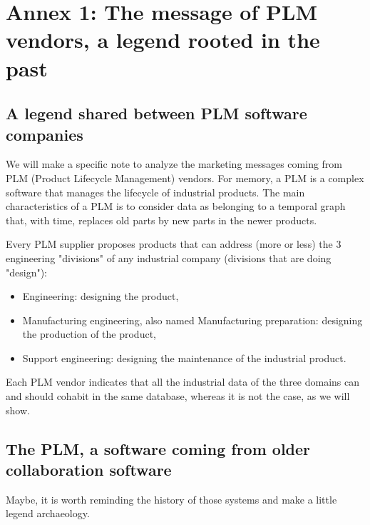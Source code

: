 \documentclass[]{article}
\begin{document}
\section{Annex 1: The message of PLM vendors, a legend rooted in the past}

\subsection{A legend shared between PLM software companies}
\label{plm-vendors}

We will make a specific note to analyze the marketing messages coming from PLM (Product Lifecycle Management) vendors. For memory, a PLM is a complex software that manages the lifecycle of industrial products. The main characteristics of a PLM is to consider data as belonging to a temporal graph that, with time, replaces old parts by new parts in the newer products.

Every PLM supplier proposes products that can address (more or less) the 3 engineering "divisions" of any industrial company (divisions that are doing "design"):

\begin{itemize}
\item Engineering: designing the product,
\item Manufacturing engineering, also named Manufacturing preparation: designing the production of the product,
\item Support engineering: designing the maintenance of the industrial product.
\end{itemize}

Each PLM vendor indicates that all the industrial data of the three domains can and should cohabit in the same database, whereas it is not the case, as we will show.

\subsection{The PLM, a software coming from older collaboration software}

Maybe, it is worth reminding the history of those systems and make a little legend archaeology.
\end{document}
